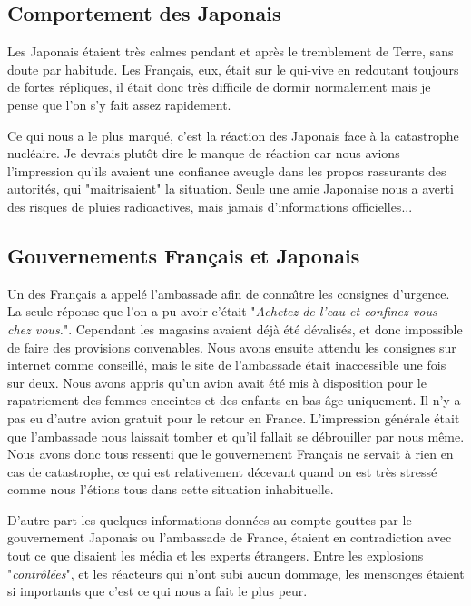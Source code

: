 \documentclass[11pt,journal]{RapportFR}
\begin{document}
\begin{CJK*}{UTF8}{min}
\subsection{Comportement des Japonais}

Les Japonais \'etaient tr\`es calmes pendant et apr\`es le tremblement de Terre, sans doute par habitude. Les Fran\c cais, eux, \'etait sur le qui-vive en redoutant toujours de fortes r\'epliques, il \'etait donc tr\`es difficile de dormir normalement mais je pense que l'on s'y fait assez rapidement.

Ce qui nous a le plus marqu\'e, c'est la r\'eaction des Japonais face \`a la catastrophe nucl\'eaire. Je devrais plut\^ot dire le manque de r\'eaction car nous avions l'impression qu'ils avaient une confiance aveugle dans les propos rassurants des autorit\'es, qui "maitrisaient" la situation. Seule une amie Japonaise nous a averti des risques de pluies radioactives, mais jamais d'informations officielles...

\subsection{Gouvernements Fran\c cais et Japonais}

Un des Fran\c cais a appel\'e l'ambassade afin de conna\^\i tre les consignes d'urgence. La seule r\'eponse que l'on a pu avoir c'\'etait "\textit{Achetez de l'eau et confinez vous chez vous.}". Cependant les magasins avaient d\'ej\`a \'et\'e d\'evalis\'es, et donc impossible de faire des provisions convenables.
Nous avons ensuite attendu les consignes sur internet comme conseill\'e, mais le site de l'ambassade \'etait inaccessible une fois sur deux. Nous avons appris qu'un avion avait \'et\'e mis \`a disposition pour le rapatriement des femmes enceintes et des enfants en bas \^age uniquement. Il n'y a pas eu d'autre avion gratuit pour le retour en France.
L'impression g\'en\'erale \'etait que l'ambassade nous laissait tomber et qu'il fallait se d\'ebrouiller par nous m\^eme. Nous avons donc tous ressenti que le gouvernement Fran\c cais ne servait \`a rien en cas de catastrophe, ce qui est relativement d\'ecevant quand on est tr\`es stress\'e comme nous l'\'etions tous dans cette situation inhabituelle.

D'autre part les quelques informations donn\'ees au compte-gouttes par le gouvernement Japonais ou l'ambassade de France, \'etaient en contradiction avec tout ce que disaient les m\'edia et les experts \'etrangers. Entre les explosions "\textit{contr\^ol\'ees}", et les r\'eacteurs qui n'ont subi aucun dommage, les mensonges \'etaient si importants que c'est ce qui nous a fait le plus peur.


\end{CJK*}
\end{document}
